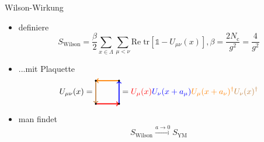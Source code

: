 \documentclass[ngerman]{beamer}
\begin{document}
\begin{frame}{Wilson-Wirkung}
\begin{itemize}
	\item definiere
	\[
	S_\text{Wilson} = \frac{\beta}{2} \sum_{x \in \Lambda} \sum_{\mu < \nu} \text{Re} \; \text{tr} \left[\mathds{1} - U_{\mu \nu}(x) \right],
	\beta = \frac{2 N_\text{c}}{g^2} = \frac{4}{g^2}
	\]
	\item ...mit Plaquette
	\[
	U_{\mu \nu}(x) =
	\begin{tikzpicture}[baseline=-0.5ex]
	\draw[->, red, very thick] (0,-.5) -> (1,-.5);
	\draw[->, blue, very thick] (1,-.5) -> (1,.5);
	\draw[->, orange, very thick] (1,.5) -> (0,.5);
	\draw[->, brown, very thick] (0,.5) -> (0,-.5);
	\foreach \x in {0,...,1}
	{
		\foreach \y in {-.5,...,.5}
		{
			\fill[color=black] (\x,\y) circle (.04);
		}
	}
	\end{tikzpicture}
	= \textcolor{red}{U_\mu(x)}
	\textcolor{blue}{U_\nu(x + a_\mu)}
	\textcolor{orange}{U_\mu(x + a_\nu)^\dag}
	\textcolor{brown}{U_\nu(x)^\dag}
	\]		
	\item man findet
	\[
	S_\text{Wilson} \xrightarrow{a \rightarrow 0} S_\text{YM}
	\]
\end{itemize}
\end{frame}
\end{document}
